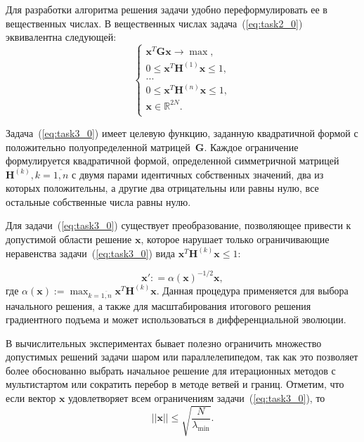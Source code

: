 Для разработки алгоритма решения задачи удобно переформулировать ее в вещественных числах. В вещественных числах задача~(\ref{eq:task2_0}) эквивалентна следующей:
        \begin{equation}
            \begin{cases}
               \textbf{x}^{T}\textbf{Gx} \rightarrow \max,\\
               0 \leq \textbf{x}^{T}\textbf{H}^{(1)}\textbf{x} \leq 1,\\
               ...\\
               0 \leq \textbf{x}^{T}\textbf{H}^{(n)}\textbf{x} \leq 1,\\
              \textbf{x} \in \mathbb{R}^{2N}.\\
             \end{cases}
             \label{eq:task3_0}
        \end{equation}

Задача~(\ref{eq:task3_0}) имеет целевую функцию, заданную квадратичной формой с положительно полуопределенной матрицей~$\textbf{G}$. Каждое ограничение формулируется квадратичной формой, определенной симметричной матрицей~$\textbf{H}^{(k)}, k=\overline{1,n}$ с двумя парами идентичных собственных значений, два из которых положительны, а другие два отрицательны или равны нулю, все остальные собственные числа равны нулю.

Для задачи~(\ref{eq:task3_0}) существует преобразование, позволяющее привести к допустимой области решение $\textbf{x}$, которое нарушает только ограничивающие неравенства задачи~(\ref{eq:task3_0}) вида $\textbf{x}^{T}\textbf{H}^{(k)}\textbf{x} \leq 1$:

\begin{equation}
    \textbf{x}': =\alpha(\textbf{x})^{-1/2} \textbf{x} ,
    \label{eq:scale_0}
\end{equation}
где $\alpha(\textbf{x}):=\max_{k=\overline{1,n}} \textbf{x}^T \textbf{H}^{(k)}\textbf{x}$. Данная процедура применяется для выбора начального решения, а также для масштабирования итогового решения градиентного подъема и может использоваться  в дифференциальной эволюции.

В вычислительных экспериментах бывает полезно ограничить множество допустимых решений задачи шаром или параллелепипедом, так как это позволяет более обоснованно выбрать начальное решение для итерационных методов с мультистартом или сократить перебор в методе ветвей и границ. Отметим, что если вектор $\textbf{x}$ удовлетворяет всем ограничениям задачи~(\ref{eq:task3_0}), то
\begin{equation} \label{eqn:bound}
||\textbf{x}||\le \sqrt{\frac{N}{\lambda_{\min}}}.
\end{equation}

